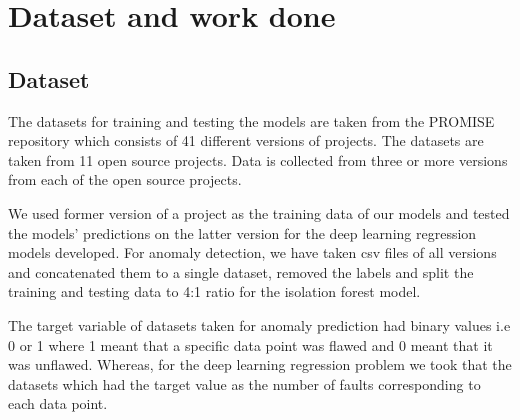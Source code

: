 \chapter{Dataset and work done}\label{final}
\section{Dataset}\label{sec2.1}
 The datasets for training and testing the models are taken from the PROMISE repository which consists of 41 different versions of projects. The datasets are taken from 11 open source projects. Data is collected from three or more versions from each of the open source projects.
 
 We used former version of a project as the training data of our models and tested the models' predictions on the latter version for the deep learning regression models developed.
 For anomaly detection, we have taken csv files of all versions and concatenated them to a single dataset, removed the labels and split the training and testing data to 4:1 ratio for the isolation forest model.
 
 The target variable of datasets taken for anomaly prediction had binary values i.e 0 or 1 where 1 meant that a specific data point was flawed and 0 meant that it was unflawed. Whereas, for the deep learning regression problem we took that the datasets which had the target value as the number of faults corresponding to each data point.

